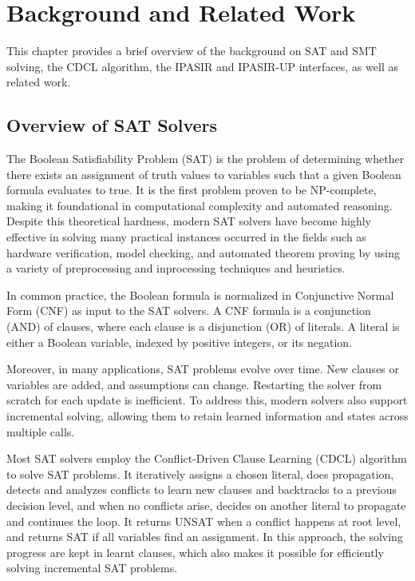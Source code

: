 \chapter{Background and Related Work}

This chapter provides a brief overview of the background on SAT and SMT solving, the CDCL algorithm, the IPASIR and IPASIR-UP interfaces, as well as related work.

\section{Overview of SAT Solvers}

The Boolean Satisfiability Problem (SAT) is the problem of determining whether there exists an assignment of truth values to variables such that a given Boolean formula evaluates to true. It is the first problem proven to be NP-complete, making it foundational in computational complexity and automated reasoning. Despite this theoretical hardness, modern SAT solvers have become highly effective in solving many practical instances occurred in the fields such as hardware verification, model checking, and automated theorem proving by using a variety of preprocessing and inprocessing techniques and heuristics.

In common practice, the Boolean formula is normalized in Conjunctive Normal Form (CNF) as input to the SAT solvers. A CNF formula is a conjunction (AND) of clauses, where each clause is a disjunction (OR) of literals. A literal is either a Boolean variable, indexed by positive integers, or its negation.

Moreover, in many applications, SAT problems evolve over time. New clauses or variables are added, and assumptions can change. Restarting the solver from scratch for each update is inefficient. To address this, modern solvers also support incremental solving, allowing them to retain learned information and states across multiple calls.

Most SAT solvers employ the Conflict-Driven Clause Learning (CDCL) algorithm to solve SAT problems. It iteratively assigns a chosen literal, does propagation, detects and analyzes conflicts to learn new clauses and backtracks to a previous decision level, and when no conflicts arise, decides on another literal to propagate and continues the loop. It returns UNSAT when a conflict happens at root level, and returns SAT if all variables find an assignment. In this approach, the solving progress are kept in learnt clauses, which also makes it possible for efficiently solving incremental SAT problems.

